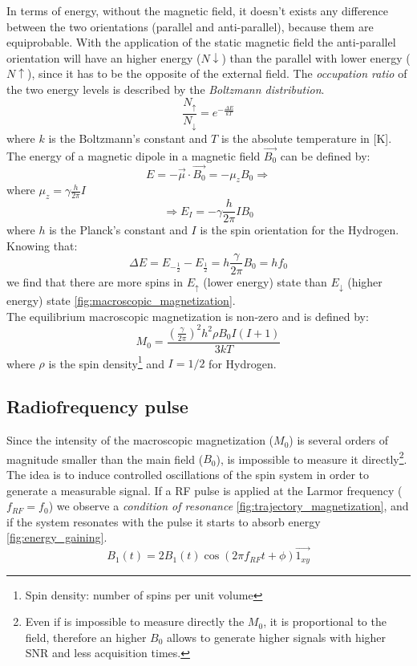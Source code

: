  \noindent In terms of energy, without the magnetic field, it doesn't exists any difference between the two orientations (parallel and anti-parallel), because them are equiprobable. With the application of the static magnetic field the anti-parallel orientation will have an higher energy ($N\downarrow$) than the parallel with lower energy ($N\uparrow$), since it has to be the opposite of the external field. The \emph{occupation ratio} of the two energy levels is described by the \emph{Boltzmann distribution}.
 \begin{equation}
    \frac{N_\uparrow}{N_\downarrow}=e^{-\frac{\Delta E}{k T}}
 \end{equation}
 where $k$ is the Boltzmann's constant and $T$ is the absolute temperature in [K].\\
 The energy of a magnetic dipole in a magnetic field $\vec{B_0}$ can be defined by:
 \[E=-\vec{\mu}\cdot\vec{B_0}=-\mu_z B_0 \Rightarrow\]
 where $\mu_z=\gamma\frac{h}{2\pi}I$ 
 \[\Rightarrow E_I=-\gamma\frac{h}{2\pi}I B_0\]
 where $h$ is the Planck's constant and $I$ is the spin orientation for the Hydrogen.
 Knowing that:
 \[\Delta E=E_{-\frac{1}{2}} - E_{\frac{1}{2}} = h\frac{\gamma}{2\pi}B_0 = h f_0\]
 we find that there are more spins in $E_\uparrow$ (lower energy) state than $E_\downarrow$ (higher energy) state \ref{fig:macroscopic_magnetization}.\\
 The equilibrium macroscopic magnetization is non-zero and is defined by:
 \begin{equation}
    M_0=\frac{(\frac{\gamma}{2\pi})^{2}h^{2}\rho B_{0}I (I+1)}{3kT}
 \end{equation}
 where $\rho$ is the spin density\footnote{Spin density: number of spins per unit volume} and $I = 1/2$ for Hydrogen.

 \subsection{Radiofrequency pulse}
 Since the intensity of the macroscopic magnetization ($M_0$) is several orders of magnitude smaller than the main field ($B_0$), is impossible to measure it directly\footnote{Even if is impossible to measure directly the $M_0$, it is proportional to the field, therefore an higher $B_0$ allows to generate higher signals with higher SNR and less acquisition times.}.\\
 The idea is to induce controlled oscillations of the spin system in order to generate a measurable signal. If a RF pulse is applied at the Larmor frequency ($f_{RF} = f_0$) we observe a \emph{condition of resonance} \ref{fig:trajectory_magnetization}, and if the system resonates with the pulse it starts to absorb energy \ref{fig:energy_gaining}.
 \begin{equation}
    B_{1}(t)=2B_{1}(t)\cos(2\pi f_{RF}t+\phi)\vec{1_{xy}}
 \end{equation}

